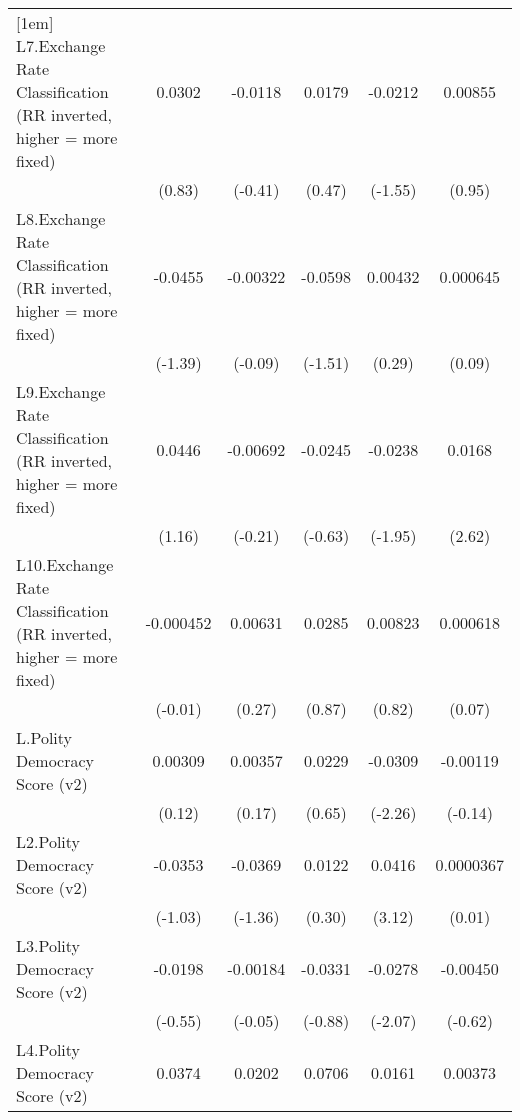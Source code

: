 {\begin{longtable}{l*{5}{c}}
[1em]
L7.Exchange Rate Classification (RR inverted, higher = more fixed)&   0.0302         &  -0.0118         &   0.0179         &  -0.0212         &  0.00855         \\
                &   (0.83)         &  (-0.41)         &   (0.47)         &  (-1.55)         &   (0.95)         \\
[1em]
L8.Exchange Rate Classification (RR inverted, higher = more fixed)&  -0.0455         & -0.00322         &  -0.0598         &  0.00432         & 0.000645         \\
                &  (-1.39)         &  (-0.09)         &  (-1.51)         &   (0.29)         &   (0.09)         \\
[1em]
L9.Exchange Rate Classification (RR inverted, higher = more fixed)&   0.0446         & -0.00692         &  -0.0245         &  -0.0238         &   0.0168\sym{**} \\
                &   (1.16)         &  (-0.21)         &  (-0.63)         &  (-1.95)         &   (2.62)         \\
[1em]
L10.Exchange Rate Classification (RR inverted, higher = more fixed)&-0.000452         &  0.00631         &   0.0285         &  0.00823         & 0.000618         \\
                &  (-0.01)         &   (0.27)         &   (0.87)         &   (0.82)         &   (0.07)         \\
[1em]
L.Polity Democracy Score (v2)&  0.00309         &  0.00357         &   0.0229         &  -0.0309\sym{*}  & -0.00119         \\
                &   (0.12)         &   (0.17)         &   (0.65)         &  (-2.26)         &  (-0.14)         \\
[1em]
L2.Polity Democracy Score (v2)&  -0.0353         &  -0.0369         &   0.0122         &   0.0416\sym{**} &0.0000367         \\
                &  (-1.03)         &  (-1.36)         &   (0.30)         &   (3.12)         &   (0.01)         \\
[1em]
L3.Polity Democracy Score (v2)&  -0.0198         & -0.00184         &  -0.0331         &  -0.0278\sym{*}  & -0.00450         \\
                &  (-0.55)         &  (-0.05)         &  (-0.88)         &  (-2.07)         &  (-0.62)         \\
[1em]
L4.Polity Democracy Score (v2)&   0.0374         &   0.0202         &   0.0706\sym{*}  &   0.0161         &  0.00373         \\

\end{longtable}}
